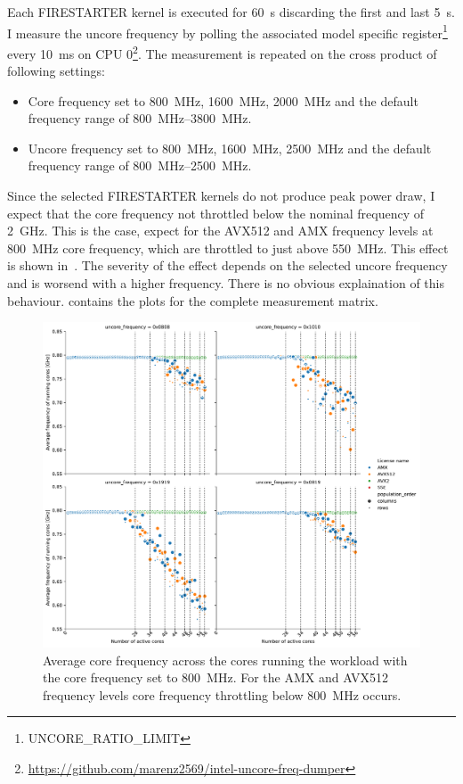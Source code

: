 Each FIRESTARTER kernel is executed for \SI{60}{\s} discarding the first and last \SI{5}{\s}.
I measure the uncore frequency by polling the associated model specific register\footnote{UNCORE\_RATIO\_LIMIT} every \SI{10}{\ms} on CPU 0\footnote{\url{https://github.com/marenz2569/intel-uncore-freq-dumper}}.
The measurement is repeated on the cross product of following settings:
\begin{itemize}
    \item Core frequency set to \SI{800}{\MHz}, \SI{1600}{\MHz}, \SI{2000}{\MHz} and the default frequency range of \SI{800}{\MHz}--\SI{3800}{\MHz}.
    \item Uncore frequency set to \SI{800}{\MHz}, \SI{1600}{\MHz}, \SI{2500}{\MHz} and the default frequency range of \SI{800}{\MHz}--\SI{2500}{\MHz}.
\end{itemize}

Since the selected FIRESTARTER kernels do not produce peak power draw, I expect that the core frequency not throttled below the nominal frequency of \SI{2}{\GHz}.
This is the case, expect for the AVX512 and AMX frequency levels at \SI{800}{\MHz} core frequency, which are throttled to just above \SI{550}{\MHz}.
This effect is shown in~.
The severity of the effect depends on the selected uncore frequency and is worsend with a higher frequency.
There is no obvious explaination of this behaviour.
 contains the plots for the complete measurement matrix.

\begin{figure}[]
    \centering
    \includegraphics[width=0.8\columnwidth]{fig/avx-frequency-license-bands-without-isst-core-frequency-800.pdf}
    \caption{\label{fig:avx-anomalies-low-freq}Average core frequency across the cores running the workload with the core frequency set to \SI{800}{\MHz}. For the AMX and AVX512 frequency levels core frequency throttling below \SI{800}{\MHz} occurs.}
\end{figure}


